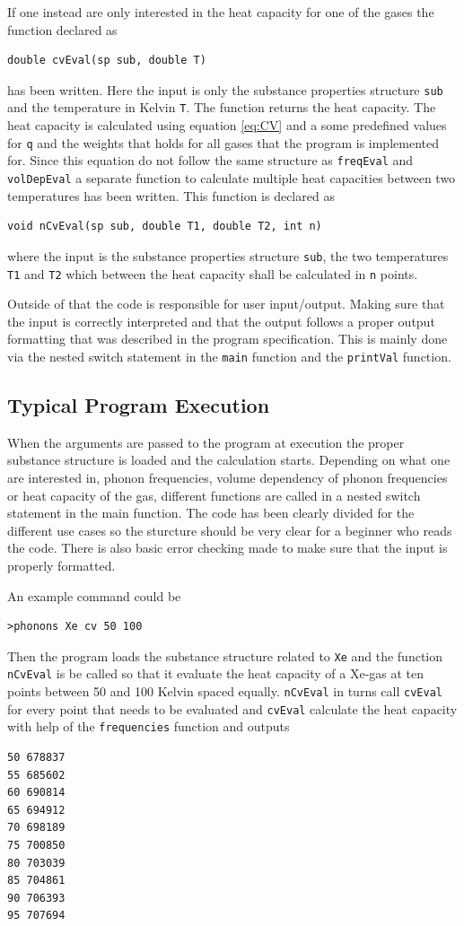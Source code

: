 \documentclass[11pt]{article}
\begin{document}
If one instead are only interested in the heat capacity for one of the gases the function declared as
\begin{lstlisting}
double cvEval(sp sub, double T)
\end{lstlisting} 
has been written. Here the input is only the substance properties structure \verb+sub+ and the temperature in Kelvin \verb+T+. The function returns the heat capacity. The heat capacity is calculated using equation \ref{eq:CV} and a some predefined values for \verb+q+ and the weights that holds for all gases that the program is implemented for. Since this equation do not follow the same structure as \verb+freqEval+ and \verb+volDepEval+ a separate function to calculate multiple heat capacities between two temperatures has been written. This function is declared as
\begin{lstlisting}
void nCvEval(sp sub, double T1, double T2, int n)
\end{lstlisting}
where the input is the substance properties structure \verb+sub+, the two temperatures \verb+T1+ and \verb+T2+ which between the heat capacity shall be calculated in \verb+n+ points.  

Outside of that the code is responsible for user input/output. Making sure that the input is correctly interpreted and that the output follows a proper output formatting that was described in the program specification. This is mainly done via the nested switch statement in the \verb+main+ function and the \verb+printVal+ function.

\subsection{Typical Program Execution}
When the arguments are passed to the program at execution the proper substance structure is loaded and the calculation starts. Depending on what one are interested in, phonon frequencies, volume dependency of phonon frequencies or heat capacity of the gas, different functions are called in a nested switch statement in the main function. The code has been clearly divided for the different use cases so the sturcture should be very clear for a beginner who reads the code. There is also basic error checking made to make sure that the input is properly formatted.

An example command could be
\begin{lstlisting}
>phonons Xe cv 50 100
\end{lstlisting}
Then the program loads the substance structure related to \verb+Xe+ and the function \verb+nCvEval+ is be called so that it evaluate the heat capacity of a Xe-gas at ten points between 50 and 100 Kelvin spaced equally. \verb+nCvEval+ in turns call \verb+cvEval+ for every point that needs to be evaluated and \verb+cvEval+ calculate the heat capacity with help of the \verb+frequencies+ function and outputs
\begin{lstlisting}
50 678837
55 685602
60 690814
65 694912
70 698189
75 700850
80 703039
85 704861
90 706393
95 707694
\end{lstlisting}
\end{document}
